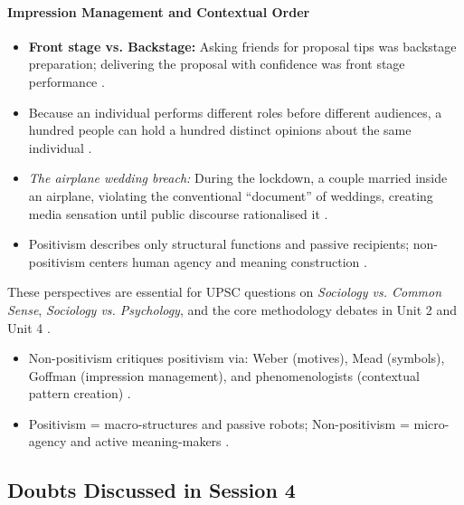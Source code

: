 \paragraph{Impression Management and Contextual Order}
\begin{itemize}
    \item \textbf{Front stage vs. Backstage:} Asking friends for proposal tips was backstage preparation; delivering the proposal with confidence was front stage performance .
    \item Because an individual performs different roles before different audiences, a hundred people can hold a hundred distinct opinions about the same individual .
    \item \textit{The airplane wedding breach:} During the lockdown, a couple married inside an airplane, violating the conventional ``document'' of weddings, creating media sensation until public discourse rationalised it .
    \item Positivism describes only structural functions and passive recipients; non-positivism centers human agency and meaning construction .
\end{itemize}

\begin{PYQLink}
These perspectives are essential for UPSC questions on \textit{Sociology vs. Common Sense}, \textit{Sociology vs. Psychology}, and the core methodology debates in Unit 2 and Unit 4 .
\end{PYQLink}

\begin{QuickRevision}
\begin{itemize}
    \item Non-positivism critiques positivism via: Weber (motives), Mead (symbols), Goffman (impression management), and phenomenologists (contextual pattern creation) .
    \item Positivism = macro-structures and passive robots; Non-positivism = micro-agency and active meaning-makers .
\end{itemize}
\end{QuickRevision}

\subsection{Doubts Discussed in Session 4}

